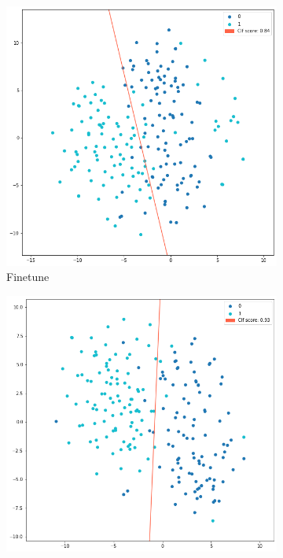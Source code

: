 \documentclass[a4paper]{article}
\begin{document}
\begin{itemize}
\begin{figure}[H]
          \begin{subfigure}[b]{0.49\columnwidth}
            \includegraphics[width=\textwidth]{Figures/transfer-finetuned.png}
            \caption{Finetune}
            \label{fig:finetune}
          \end{subfigure}
          \hfill
          \begin{subfigure}[b]{0.49\columnwidth}
            \includegraphics[width=\textwidth]{Figures/transfer-augmented.png}

\end{subfigure}
\end{figure}
\end{itemize}
\end{document}
